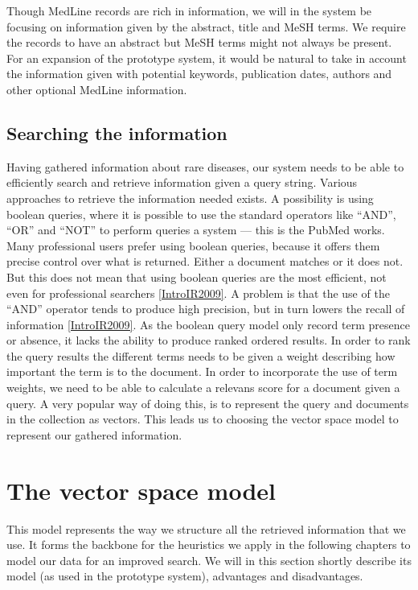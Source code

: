 Though MedLine records are rich in information, we will in the system
be focusing on information given by the abstract, title and MeSH
terms. We require the records to have an abstract but MeSH terms might
not always be present. For an expansion of the prototype system, it
would be natural to take in account the information given with
potential keywords, publication dates, authors and other optional
MedLine information. 


\subsection{Searching the information}
Having gathered information about rare diseases, our system needs to
be able to efficiently search and retrieve information given a query
string. Various approaches to retrieve the information needed
exists. A possibility is using boolean queries, where it is possible
to use the standard operators like ``AND'', ``OR'' and ``NOT'' to
perform queries a system --- this is the PubMed works. Many
professional users prefer using boolean queries, because it offers
them precise control over what is returned. Either a document matches
or it does not. But this does not mean that using boolean queries are
the most efficient, not even for professional searchers
\ref{IntroIR2009}. A problem is that the use of the ``AND'' operator
tends to produce high precision, but in turn lowers the recall of
information \ref{IntroIR2009}. As the boolean query model only record
term presence or absence, it lacks the ability to produce ranked
ordered results. In order to rank the query results the different
terms needs to be given a weight describing how important the term is
to the document. In order to incorporate the use of term weights, we
need to be able to calculate a relevans score for a document given a
query. A very popular way of doing this, is to represent the query and
documents in the collection as vectors. This leads us to choosing the
vector space model to represent our gathered information.

\section{The vector space model\label{VectorSpace}}

This model represents the way we structure all the retrieved
information that we use. It forms the backbone for the heuristics we
apply in the following chapters to model our data for an improved
search. We will in this section shortly describe its model (as used in
the prototype system), advantages and disadvantages.

